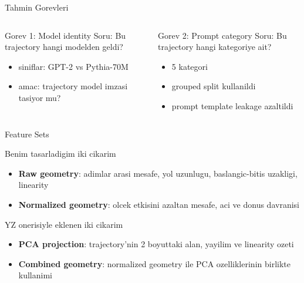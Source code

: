 \documentclass[aspectratio=169]{beamer}
\begin{document}
\begin{frame}{Tahmin Gorevleri}
  \begin{columns}[T]
    \begin{block}{Gorev 1: Model identity}
      Soru: Bu trajectory hangi modelden geldi?
      \begin{itemize}
        \item siniflar: GPT-2 vs Pythia-70M
        \item amac: trajectory model imzasi tasiyor mu?
      \end{itemize}
    \end{block}

    \begin{block}{Gorev 2: Prompt category}
      Soru: Bu trajectory hangi kategoriye ait?
      \begin{itemize}
        \item 5 kategori
        \item grouped split kullanildi
        \item prompt template leakage azaltildi
      \end{itemize}
    \end{block}
  \end{columns}
\end{frame}

\begin{frame}{Feature Sets}
  \begin{block}{Benim tasarladigim iki cikarim}
    \begin{itemize}
      \item \textbf{Raw geometry}: adimlar arasi mesafe, yol uzunlugu, baslangic-bitis uzakligi, linearity
      \item \textbf{Normalized geometry}: olcek etkisini azaltan mesafe, aci ve donus davranisi
    \end{itemize}
  \end{block}

  \begin{block}{YZ onerisiyle eklenen iki cikarim}
    \begin{itemize}
      \item \textbf{PCA projection}: trajectory'nin 2 boyuttaki alan, yayilim ve linearity ozeti
      \item \textbf{Combined geometry}: normalized geometry ile PCA ozelliklerinin birlikte kullanimi
    \end{itemize}
  \end{block}
\end{frame}
\end{document}
